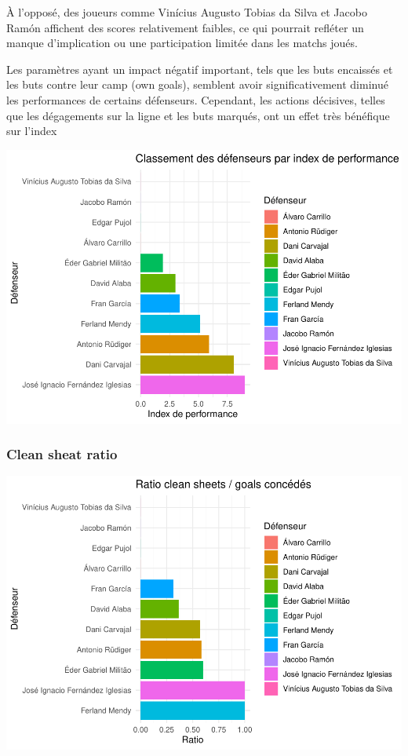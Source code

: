 \documentclass[
  6pt,
]{article}
\begin{document}
À l'opposé, des joueurs comme Vinícius Augusto Tobias da Silva et Jacobo
Ramón affichent des scores relativement faibles, ce qui pourrait
refléter un manque d'implication ou une participation limitée dans les
matchs joués.

Les paramètres ayant un impact négatif important, tels que les buts
encaissés et les buts contre leur camp (own goals), semblent avoir
significativement diminué les performances de certains défenseurs.
Cependant, les actions décisives, telles que les dégagements sur la
ligne et les buts marqués, ont un effet très bénéfique sur l'index

\includegraphics[width=0.8\linewidth]{Analyse_Impact_Performances_Joueurs_files/figure-latex/Defenders performance index-1}

\subsubsection{Clean sheat ratio}\label{clean-sheat-ratio}

\includegraphics[width=0.8\linewidth]{Analyse_Impact_Performances_Joueurs_files/figure-latex/Clean sheat ratio-def-1}
\end{document}
